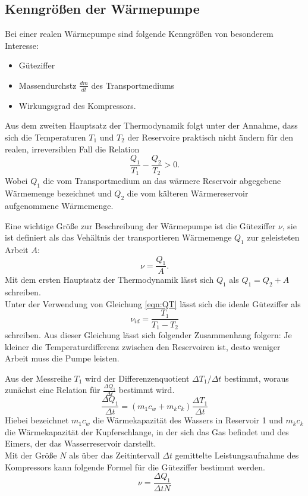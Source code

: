 \subsection{Kenngrößen der Wärmepumpe}
Bei einer realen Wärmepumpe sind folgende Kenngrößen von besonderem Interesse:
\begin{itemize}
  \item Güteziffer
  \item Massendurchstz $\frac{dm}{dt}$ des Transportmediums
  \item Wirkungsgrad des Kompressors.
\end{itemize}

Aus dem zweiten Hauptsatz der Thermodynamik folgt unter der Annahme, dass sich die Temperaturen
$T_{1}$ und $T_{2}$ der Reservoire praktisch nicht ändern für den realen, irreversiblen Fall die Relation
\begin{equation}
  \frac{Q_{1}}{T_{1}}-\frac{Q_{2}}{T_{2}}>0.
  \label{eqn:QT}
\end{equation}
Wobei $Q_{1}$ die vom Transportmedium an das wärmere Reservoir abgegebene Wärmemenge bezeichnet und
$Q_{2}$ die vom kälteren Wärmereservoir aufgenommene Wärmemenge.

Eine wichtige Größe zur Beschreibung der Wärmepumpe ist die Güteziffer $\nu$, sie ist definiert
als das Vehältnis der transportieren Wärmemenge $Q_{1}$ zur geleisteten Arbeit $A$:
\begin{equation}
  \nu=\frac{Q_{1}}{A}.
  \label{eqn:güte}
\end{equation}
Mit dem ersten Hauptsatz der Thermodynamik lässt sich $Q_{1}$ als $Q_{1}=Q_{2}+A$ schreiben.\\
Unter der Verwendung von Gleichung \ref{eqn:QT} lässt sich die ideale Güteziffer als
\begin{equation}
  \nu_{id}=\frac{T_{1}}{T_{1}-T_{2}}
  \label{eqn:güte2}
\end{equation}
schreiben. Aus dieser Gleichung lässt sich folgender Zusammenhang folgern:
Je kleiner die Temperaturdifferenz zwischen den Reservoiren ist, desto weniger Arbeit muss
die Pumpe leisten.

Aus der Messreihe $T_{1}$ wird der Differenzenquotient $\Delta T_{1}/\Delta t$ bestimmt,
woraus zunächst eine Relation für $\frac{\Delta Q_{1}}{\Delta t}$ bestimmt wird.
\begin{equation}
  \frac{\Delta Q_{1}}{\Delta {t}}=(m_{1}c_{w}+m_{k}c_{k})\frac{\Delta T_{1}}{\Delta t}
\end{equation}
Hiebei bezeichnet $m_{1}c_{w}$ die Wärmekapazität des Wassers in Reservoir 1 und $m_{k}c_{k}$ die
Wärmekapazität der Kupferschlange, in der sich das Gas befindet und des Eimers, der das Wasserreservoir darstellt.\\
Mit der Größe $N$ als über das Zeitintervall $\Delta t$ gemittelte Leistungsaufnahme des Kompressors
kann folgende Formel für die Güteziffer bestimmt werden.
\begin{equation}
  \nu = \frac{\Delta Q_{1}}{\Delta t N}
  \label{güte3}
\end{equation}

